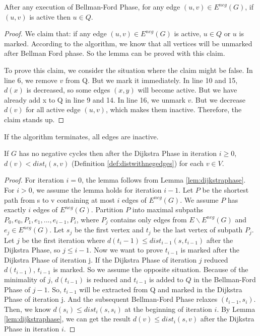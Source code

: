 \documentclass[11pt]{article}
\newcommand{\eneg}{E^{neg}}
\begin{document}
\begin{lemma}
    After any execution of Bellman-Ford Phase, for any edge $(u, v) \in \eneg(G)$, if $(u, v)$ is active then $u \in Q$.
\end{lemma}
\begin{proof}
    We claim that: if any edge $(u, v) \in \eneg(G)$ is active, $u \in Q$ or $u$ is marked. According to the algorithm, we know that all vertices will be unmarked after Bellman Ford phase. So the lemma can be proved with this claim.
    
    To prove this claim, we consider the situation where the claim might be false. In line 6, we remove $v$ from Q. But we mark it immediately. In line 10 and 15, $d(x)$ is decreased, so some edges $(x, y)$ will become active. But we have already add x to Q in line 9 and 14. In line 16, we unmark $v$. But we decrease $d(v)$ for all active edge $(u, v)$, which makes them inactive. Therefore, the claim stands up.
\end{proof}

\begin{corollary}
    If the algorithm terminates, all edges are inactive.
\end{corollary}

\begin{lemma}
    If $G$ has no negative cycles then after the Dijkstra Phase in iteration $i \ge 0$, $d(v) < dist_i(s, v)$ (Definition \ref{def:distwithnegedges}) for each $v \in V$. 
\end{lemma}
\begin{proof}
    For iteration $i = 0$, the lemma follows from Lemma \ref{lem:dijkstraphase}. For $i > 0$, we assume the lemma holds for iteration $i - 1$. Let $P$ be the shortest path from s to v containing at most $i$ edges of $\eneg(G)$. We assume $P$ has exactly $i$ edges of $\eneg(G)$. Partition $P$ into maximal subpaths $P_0, e_0, P_1, e_1, ..., e_{i-1}, P_i$, where $P_j$ contains only edges from $E \backslash \eneg(G)$ and $e_j \in \eneg(G)$. Let $s_j$ be the first vertex and $t_j$ be the last vertex of subpath $P_j$. Let $j$ be the first iteration where $d(t_i-1) \le dist_{i-1}(s, t_{i-1})$ after the Dijkstra Phase, so $j \le i-1$. Now we want to prove $t_{i-1}$ is marked after the Dijkstra Phase of iteration j. If the Dijkstra Phase of iteration $j$ reduced $d(t_{i-1})$, $t_{i-1}$ is marked. So we assume the opposite situation. Because of the minimality of $j$, $d(t_{i-1})$ is reduced and $t_{i-1}$ is added to $Q$ in the Bellman-Ford Phase of $j-1$. So, $t_{i-1}$ will be extracted from Q and marked in the Dijkstra Phase of iteration j. And the subsequent Bellman-Ford Phase relaxes $(t_{i-1}, s_i)$. Then, we know $d(s_i) \le dist_i(s, s_i)$ at the beginning of iteration $i$. By Lemma \ref{lem:dijkstraphase}, we can get the result $d(v) \le dist_i(s, v)$ after the Dijkstra Phase in iteration $i$.
\end{proof}
\end{document}
